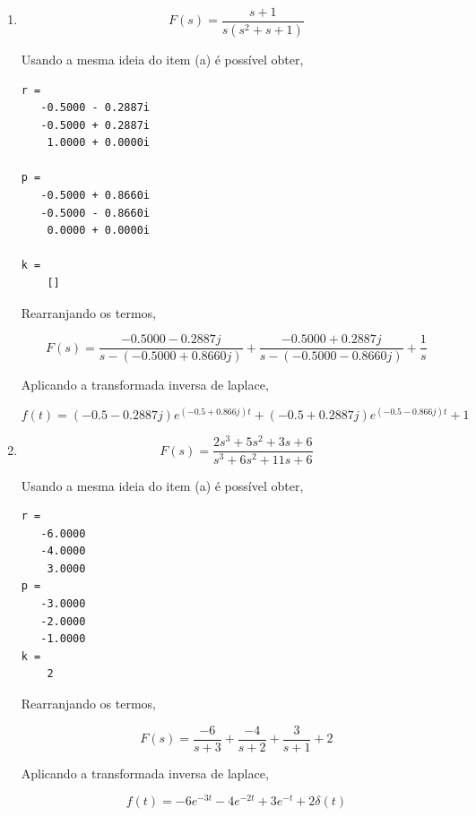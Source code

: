 \documentclass[a4paper, 10pt]{article}
\begin{document}
\begin{list}{\textbf{Questão .}}{
\setlength{\labelwidth}{-2mm} \setlength{\parsep}{0mm}
\setlength{\topsep}{0mm} \setlength{\leftmargin}{0mm}}
\begin{enumerate}
    \item

        $$
        F(s) = \frac{s+1}{s(s^2+s+1)}
        $$

        Usando a mesma ideia do item (a) é possível obter, 

        \begin{lstlisting}
r = 
   -0.5000 - 0.2887i
   -0.5000 + 0.2887i
    1.0000 + 0.0000i

p = 
   -0.5000 + 0.8660i
   -0.5000 - 0.8660i
    0.0000 + 0.0000i

k = 
    []
    \end{lstlisting}


    Rearranjando os termos, 

    $$
    F(s) = \frac{-0.5000-0.2887j}{s-(-0.5000+0.8660j)} + \frac{-0.5000+0.2887j}{s-(-0.5000-0.8660j)} + \frac{1}{s}
    $$

    Aplicando a transformada inversa de laplace,

    $$
    f(t) = (-0.5-0.2887j) e^{(-0.5+0.866j) t} + (-0.5+0.2887j) e^{(-0.5-0.866j) t} + 1
    $$

    \item

        $$
        F(s) = \frac{2 s^3 + 5 s^2 + 3 s + 6}{s^3 + 6 s^2 + 11 s + 6}
        $$

        Usando a mesma ideia do item (a) é possível obter, 

        \begin{lstlisting}
r = 
   -6.0000
   -4.0000
    3.0000
p = 
   -3.0000
   -2.0000
   -1.0000
k = 
    2
    \end{lstlisting}


        Rearranjando os termos, 

        $$
        F(s) = \frac{-6}{s+3} + \frac{-4}{s+2} + \frac{3}{s+1} + 2
        $$

        Aplicando a transformada inversa de laplace,

        $$
        f(t) = -6 e^{-3t} -4 e^{-2t} + 3 e^{-t} + 2 \delta(t)
        $$

    \end{enumerate}






\newpage



\end{list}
\end{document}
